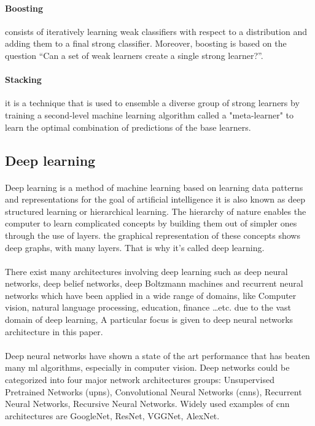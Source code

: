 \paragraph{Boosting} consists of iteratively learning weak classifiers with respect to a distribution and adding them to a final strong classifier. Moreover, boosting is based on the question ``Can a set of weak learners create a single strong learner?''\cite{MLELBO:1}.
\paragraph{Stacking} it is a technique that is used to ensemble a diverse group of strong learners by training a second-level machine learning algorithm called a "meta-learner" to learn the optimal combination of predictions of the base learners.
\subsection{Deep learning}
\paragraph{}
Deep learning is a method of machine learning based on learning data patterns and representations for the goal of artificial intelligence it is also known as deep structured learning or hierarchical learning. The hierarchy of nature enables the computer to learn complicated concepts by building them out of simpler ones through the use of layers. the graphical representation of these concepts shows deep graphs, with many layers. That is why it's called deep learning.
\paragraph{}
There exist many architectures involving deep learning such as deep neural networks, deep belief networks, deep Boltzmann machines and recurrent neural networks which have been applied in a wide range of domains, like Computer vision, natural language processing, education, finance \dots etc. due to the vast domain of deep learning, A particular focus is given to deep neural networks architecture in this paper.\cite{DLARCH:1}
\paragraph{}
Deep neural networks have shown a state of the art performance that has beaten many \ac{ml} algorithms, especially in computer vision. Deep networks could be categorized into four major network architectures groups: Unsupervised Pretrained Networks (\acs{upn}s), Convolutional Neural Networks (\acs{cnn}s), Recurrent Neural Networks, Recursive Neural Networks\cite{DLARCH:2}.
Widely used examples of \acs{cnn} architectures are GoogleNet\cite{GoogleNet}, ResNet\cite{ResNet}, VGGNet\cite{VggNet}, AlexNet\cite{AlexNet}.

